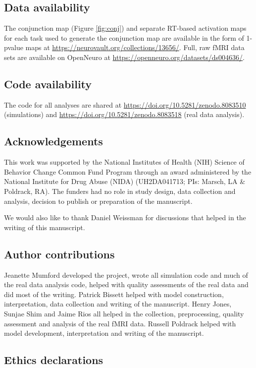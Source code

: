 \documentclass[sn-mathphys,Numbered, super, referee, lineno]{sn-jnl}
\begin{document}
\subsection*{Data availability}
The conjunction map (Figure \ref{fig:conj}) and separate RT-based activation maps for each task used to generate the conjunction map are available in the form of 1-pvalue maps at \url{https://neurovault.org/collections/13656/}. Full, raw fMRI data sets are available on OpenNeuro at \url{ https://openneuro.org/datasets/ds004636/}.

\subsection*{Code availability}
The code for all analyses are shared at \url{https://doi.org/10.5281/zenodo.8083510} (simulations) and \url{https://doi.org/10.5281/zenodo.8083518} (real data analysis). 

\subsection*{Acknowledgements}
This work was supported by the National Institutes of Health (NIH) Science of Behavior Change Common Fund Program through an award administered by the National
Institute for Drug Abuse (NIDA) (UH2DA041713; PIs: Marsch, LA \& Poldrack, RA).  The funders had no role in study design, data collection and analysis, decision to publish or preparation of the manuscript.

We would also like to thank Daniel Weissman for discussions that helped in the writing of this manuscript.



\subsection*{Author contributions}
Jeanette Mumford developed the project, wrote all simulation code and much of the real data analysis code, helped with quality assessments of the real data and did most of the writing.  Patrick Bissett helped with model construction, interpretation, data collection and writing of the manuscript.  Henry Jones, Sunjae Shim and Jaime Rios all helped in the collection, preprocessing, quality assessment and analysis of the real fMRI data.  Russell Poldrack helped with model development, interpretation and writing of the manuscript.

\subsection*{Ethics declarations}
\end{document}
